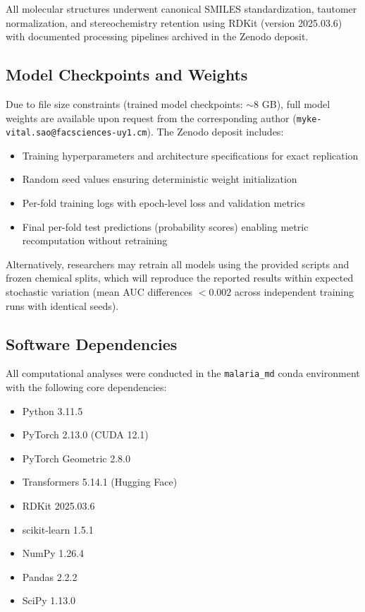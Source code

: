 \documentclass[11pt,a4paper]{article}
\begin{document}
\noindent All molecular structures underwent canonical SMILES standardization, tautomer normalization, and stereochemistry retention using RDKit (version 2025.03.6) with documented processing pipelines archived in the Zenodo deposit.

\subsection*{Model Checkpoints and Weights}

Due to file size constraints (trained model checkpoints: $\sim$8 GB), full model weights are available upon request from the corresponding author (\texttt{myke-vital.sao@facsciences-uy1.cm}). The Zenodo deposit includes:

\begin{itemize}[leftmargin=*,itemsep=0.3em]
\item Training hyperparameters and architecture specifications for exact replication
\item Random seed values ensuring deterministic weight initialization
\item Per-fold training logs with epoch-level loss and validation metrics
\item Final per-fold test predictions (probability scores) enabling metric recomputation without retraining
\end{itemize}

\noindent Alternatively, researchers may retrain all models using the provided scripts and frozen chemical splits, which will reproduce the reported results within expected stochastic variation (mean AUC differences $<0.002$ across independent training runs with identical seeds).

\subsection*{Software Dependencies}

All computational analyses were conducted in the \texttt{malaria\_md} conda environment with the following core dependencies:

\begin{itemize}[leftmargin=*,itemsep=0.2em]
\item Python 3.11.5
\item PyTorch 2.13.0 (CUDA 12.1)
\item PyTorch Geometric 2.8.0
\item Transformers 5.14.1 (Hugging Face)
\item RDKit 2025.03.6
\item scikit-learn 1.5.1
\item NumPy 1.26.4
\item Pandas 2.2.2
\item SciPy 1.13.0
\end{itemize}
\end{document}
